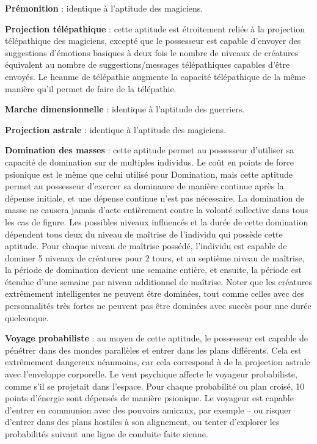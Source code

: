 \documentclass[11pt]{article}
\begin{document}
{\bigskip

\textbf{Prémonition} : identique à l'aptitude des magiciens.

\bigskip

\textbf{Projection télépathique} : cette aptitude est étroitement reliée à la projection télépathique des magiciens, excepté que le possesseur est capable d'envoyer des suggestions d'émotions basiques à deux fois le nombre de niveaux de créatures équivalent au nombre de suggestions/messages télépathiques capables d'être envoyés.%
Le heaume de télépathie augmente la capacité télépathique de la même manière qu'il permet de faire de la télépathie.

\bigskip

\textbf{Marche dimensionnelle} : identique à l'aptitude des guerriers.

\bigskip

\textbf{Projection astrale} : identique à l'aptitude des magiciens.

\bigskip

\textbf{Domination des masses} : cette aptitude permet au possesseur d'utiliser sa capacité de domination sur de multiples individus. Le coût en points de force psionique est le même que celui utilisé pour Domination, mais cette aptitude permet au possesseur d'exercer sa dominance de manière continue après la dépense initiale, et une dépense continue n'est pas nécessaire. La domination de masse ne causera jamais d'acte entièrement contre la volonté collective dans tous les cas de figure. Les possibles niveaux influencés et la durée de cette domination dépendent tous deux du niveau de maîtrise de l'individu qui possède cette aptitude. Pour chaque niveau de maîtrise possédé, l'individu est capable de dominer 5 niveaux de créatures pour 2 tours, et au septième niveau de maîtrise, la période de domination devient une semaine entière, et ensuite, la période est étendue d'une semaine par niveau additionnel de maîtrise. Noter que les créatures extrêmement intelligentes ne peuvent être dominées, tout comme celles avec des personnalités très fortes ne peuvent pas être dominées avec succès pour une durée quelconque.

\bigskip

\textbf{Voyage probabiliste} : au moyen de cette aptitude, le possesseur est capable de pénétrer dans des mondes parallèles et entrer dans les plans différents. Cela est extrêmement dangereux néanmoins, car cela correspond à de la projection astrale avec l'enveloppe corporelle. Le vent psychique affecte le voyageur probabiliste, comme s'il se projetait dans l'espace. Pour chaque probabilité ou plan croisé, 10 points d'énergie sont dépensés de manière psionique. Le voyageur est capable d'entrer en communion avec des pouvoirs amicaux, par exemple -- ou risquer d'entrer dans des plans hostiles à son alignement, ou tenter d'explorer les probabilités suivant une ligne de conduite faite sienne.



}
\end{document}
